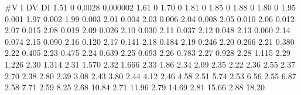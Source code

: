 #V	I		DV		DI
1.51	0 		0,0028 0,000002
1.61	0
1.70	0
1.81	0
1.85	0
1.88	0
1.80	0
1.95	0.001
1.97	0.002
1.99	0.003
2.01	0.004	
2.03	0.006
2.04	0.008
2.05	0.010
2.06	0.012
2.07	0.015
2.08	0.019
2.09	0.026
2.10	0.030
2.11	0.037
2.12	0.048
2.13	0.060
2.14	0.074
2.15	0.090
2.16	0.120
2.17	0.141
2.18	0.184
2.19	0.246
2.20	0.266
2.21	0.380
2.22	0.405
2.23	0.475
2.24	0.639
2.25	0.693
2.26	0.783
2.27	0.928
2.28	1.115
2.29	1.226
2.30	1.314
2.31	1.570
2.32	1.666
2.33	1.86
2.34	2.09
2.35	2.22
2.36	2.55
2.37	2.70
2.38	2.80
2.39	3.08
2.43	3.80
2.44	4.12
2.46	4.58
2.51	5.74
2.53	6.56
2.55	6.87
2.58	7.71
2.59	8.25
2.68	10.84
2.71	11.96
2.79	14.69
2.81	15.66
2.88	18.20


